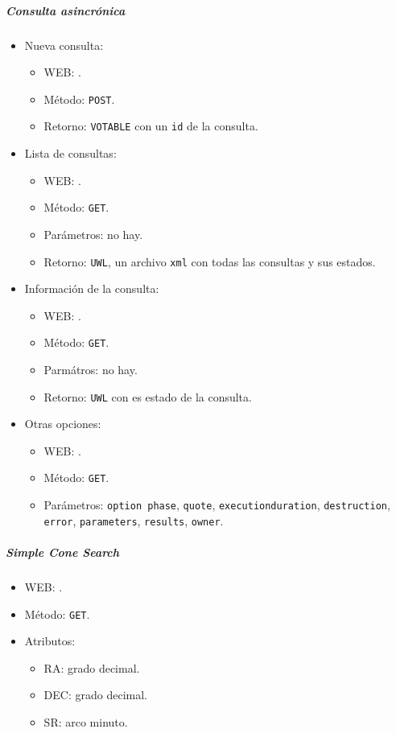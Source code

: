 \subparagraph{Consulta asincrónica}

\begin{itemize}
	\item Nueva consulta:
		\begin{itemize}
			\item WEB: \url{}.
			\item M\'etodo: \verb;POST;.
			\item Retorno: \verb;VOTABLE; con un \verb;id; de la consulta.
		\end{itemize}
	\item Lista de consultas:
		\begin{itemize}
			\item WEB: \url{}.
			\item M\'etodo: \verb;GET;.
			\item Parámetros: no hay.
			\item Retorno: \verb;UWL;, un archivo \verb;xml; con todas las consultas y sus estados.
		\end{itemize}
	\item Información de la consulta:
		\begin{itemize}
			\item WEB: \url{}.
			\item M\'etodo: \verb;GET;.
			\item Parmátros: no hay.
			\item Retorno: \verb;UWL; con es estado de la consulta.
		\end{itemize}
	\item Otras opciones:
		\begin{itemize}
			\item WEB: \url{}.
			\item M\'etodo: \verb;GET;.
			\item Parámetros: \verb;option phase;, \verb;quote;, \verb;executionduration;, \verb;destruction;, \verb;error;, \verb;parameters;, \verb;results;, \verb;owner;.
		\end{itemize}
\end{itemize}

\subparagraph{Simple Cone Search}

\begin{itemize}
	\item WEB: \url{}.
	\item M\'etodo: \verb;GET;.
	\item Atributos: 
		\begin{itemize}
			\item RA: grado decimal.
			\item DEC: grado decimal.
			\item SR: arco minuto.
		\end{itemize}
\end{itemize}

